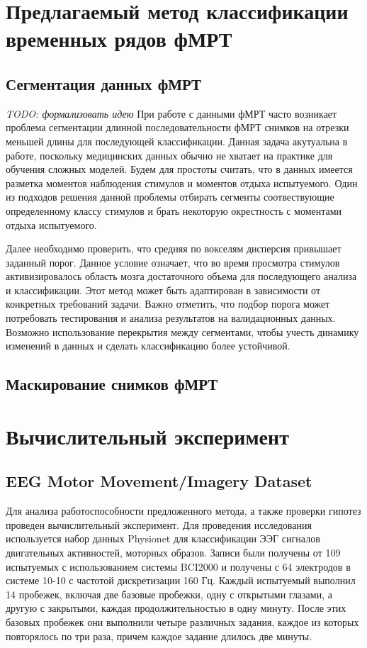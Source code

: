 \documentclass[a4paper, 12pt]{extarticle}
\begin{document}
\section{Предлагаемый метод классификации временных рядов фМРТ}
\subsection{Сегментация данных фМРТ}
\textit{TODO: формализовать идею}
При работе с данными фМРТ часто возникает проблема сегментации длинной 
последовательности фМРТ снимков на отрезки меньшей длины для последующей классификации.
Данная задача акутуальна в работе, поскольку медицинских данных обычно не хватает на практике для обучения 
сложных моделей. Будем для простоты считать, что в данных имеется разметка моментов наблюдения стимулов и моментов отдыха испытуемого.
Один из подходов решения данной проблемы отбирать сегменты соотвествующие определенному классу стимулов и брать некоторую окрестность с 
моментами отдыха испытуемого. 

Далее необходимо проверить, что средняя по вокселям дисперсия привышает заданный порог. 
Данное условие означает, что во время просмотра стимулов активизировалось область мозга достаточного объема для последующего анализа и классификации.
Этот метод может быть адаптирован в зависимости от конкретных требований задачи. 
Важно отметить, что подбор порога может потребовать тестирования и анализа результатов на валидационных данных.
Возможно использование перекрытия между сегментами, чтобы учесть динамику изменений в данных и сделать классификацию более устойчивой.

\subsection{Маскирование снимков фМРТ}


\section{Вычислительный эксперимент}
\subsection{EEG Motor Movement/Imagery Dataset}
Для анализа работоспособности предложенного метода, а также проверки гипотез
проведен вычислительный эксперимент.
Для проведения исследования используется набор данных Physionet \citep{schalk2004bci2000, EEG_MI} для классификации ЭЭГ сигналов 
двигательных активностей, моторных образов. 
Записи были получены от 109 испытуемых с использованием системы BCI2000 и получены с 64 электродов в системе 10-10 \citep{seeck2017standardized} 
с частотой дискретизации 160 Гц. 
Каждый испытуемый выполнил 14 пробежек, включая две базовые пробежки, одну с открытыми глазами, а другую с закрытыми, 
каждая продолжительностью в одну минуту. После этих базовых пробежек они выполнили четыре различных задания, каждое из которых повторялось по три раза, 
причем каждое задание длилось две минуты.
 
\end{document}
